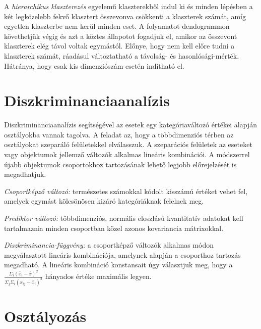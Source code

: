 A \emph{hierarchikus klaszterezés} egyelemű klaszterekből indul ki és minden lépésben a két legközelebb fekvő klasztert összevonva csökkenti a klaszterek számát, amíg egyetlen klaszterbe nem kerül minden eset. A folyamatot dendogrammon követhetjük végig és azt a köztes állapotot fogadjuk el, amikor az összevont klaszterek elég távol voltak egymástól. Előnye, hogy nem kell előre tudni a klaszterek számát, ráadásul változtatható a távolság- és hasonlósági-mérték. Hátránya, hogy csak kis dimenziószám esetén indítható el.

\section{Diszkriminanciaanalízis}

Diszkriminanciaanalízis segítségével az esetek egy kategóriaváltozó értékei alapján osztályokba vannak tagolva. A feladat az, hogy a többdimenziós térben az osztályokat szeparáló felületekkel elválasszuk. A szeparációs felületek az eseteket vagy objektumok jellemző változók alkalmas lineáris kombinációi. A módszerrel újabb objektumok csoportokhoz tartozásának lehető legjobb előrejelzését is megadhatjuk.

\emph{Csoportképző változó:} természetes számokkal kódolt kisszámú értéket vehet fel, amelyek egymást kölcsönösen kizáró kategóriáknak felelnek meg.

\emph{Prediktor változó:} többdimenziós, normális eloszlású kvantitatív adatokat kell tartalmaznia minden csoportban közel azonos kovariancia mátrixokkal.

\emph{Diszkriminancia-függvény:} a csoportképző változók alkalmas módon megválasztott lineáris kombinációja, amelynek alapján a csoporthoz tartozás megadható. A lineáris kombináció konstansait úgy választjuk meg, hogy a $\frac{\Sigma_i (\bar{x}_i - \bar{x})^2}{\Sigma_j \Sigma_i (x_{ij} - \bar{x}_i)^2}$ hányados értéke maximális legyen.

\section{Osztályozás}

